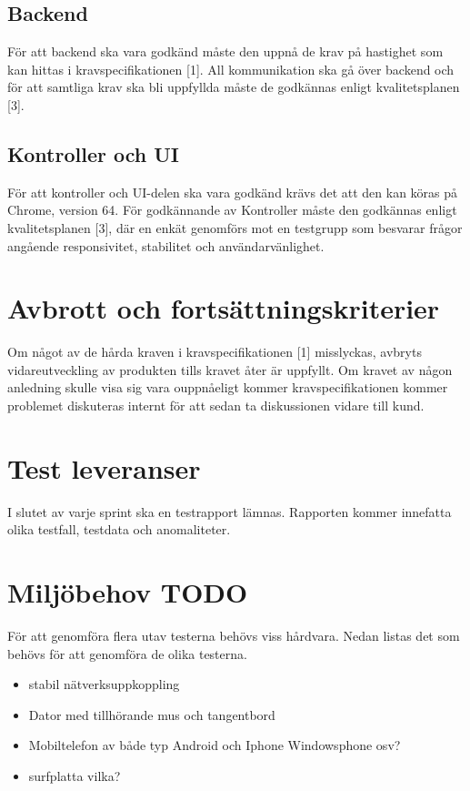 \documentclass[10pt]{article}
\begin{document}
	\subsection{Backend}
		För att backend ska vara godkänd måste den uppnå de krav på hastighet som kan hittas i kravspecifikationen {\color{red}[1]}. All kommunikation ska gå över backend och för att samtliga krav ska bli uppfyllda måste de godkännas enligt kvalitetsplanen  {\color{red}[3]}.

	\subsection{Kontroller och UI}
		För att kontroller och UI-delen ska vara godkänd krävs det att den kan köras på Chrome, version 64. För godkännande av Kontroller måste den godkännas enligt kvalitetsplanen {\color{red}[3]}, där en enkät genomförs mot en testgrupp som besvarar frågor angående responsivitet, stabilitet och användarvänlighet.



\section{Avbrott och fortsättningskriterier}
	Om något av de hårda kraven i kravspecifikationen {\color{red}[1]} misslyckas, avbryts vidareutveckling av produkten tills kravet åter är uppfyllt. Om kravet av någon anledning skulle visa sig vara ouppnåeligt kommer kravspecifikationen kommer problemet diskuteras internt för att sedan ta diskussionen vidare till kund. 



\section{Test leveranser}
	I slutet av varje sprint ska en testrapport lämnas. Rapporten kommer innefatta olika testfall, testdata och anomaliteter.


	

\section{Miljöbehov {\color{red}TODO}}
	För att genomföra flera utav testerna behövs viss hårdvara. Nedan listas det som behövs för att genomföra de olika testerna. 

	\begin{itemize}
	\item stabil nätverksuppkoppling
	\item Dator med tillhörande mus och tangentbord
	\item Mobiltelefon av både typ Android och Iphone {\color{red}Windowsphone osv?}
	\item surfplatta {\color{red}vilka?}
	\end{itemize}
\end{document}
